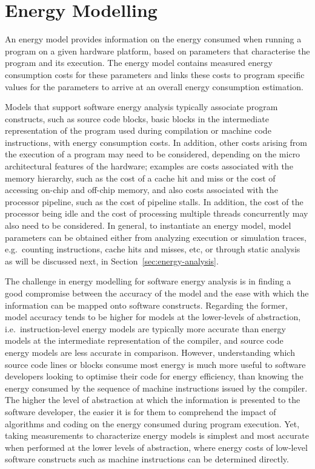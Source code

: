 \nopagebreak
\section{Energy Modelling}\label{sec:energy-models}

An energy model provides information on the energy consumed when running a program on a given hardware platform, based on parameters that characterise the program and its execution. The energy model contains measured energy consumption costs for these parameters and links these costs to program specific values for the parameters to arrive at an overall energy consumption estimation. 

Models that support software energy analysis typically associate program constructs, such as source code blocks, basic blocks in the intermediate representation of the program used during compilation or machine code instructions, with energy consumption costs. In addition, other costs arising from the execution of a program may need to be considered, depending on the micro architectural features of the hardware; examples are costs associated with the memory hierarchy, such as the cost of a cache hit and miss or the cost of accessing on-chip and off-chip memory, and also costs associated with the processor pipeline, such as the cost of pipeline stalls. In addition, the cost of the processor being idle and the cost of processing multiple threads concurrently may also need to be considered. 
%
In general, to instantiate an energy model, model parameters can be obtained either from analyzing execution or simulation traces, e.g.\ counting instructions, cache hits and misses, etc, or through static analysis as will be discussed next, in Section~\ref{sec:energy-analysis}.

The challenge in energy modelling for software energy analysis is in finding a good compromise between the accuracy of the model and the ease with which the information can be mapped onto software constructs. Regarding the former, model accuracy tends to be higher for models at the lower-levels of abstraction, i.e.\ instruction-level energy models are typically more accurate than energy models at the intermediate representation of the compiler, and source code energy models are less accurate in comparison. 
%
However, understanding which source code lines or blocks consume most energy is much more useful to software developers looking to optimise their code for energy efficiency, than knowing the energy consumed by the sequence of machine instructions issued by the compiler. The higher the level of abstraction at which the information is presented to the software developer, the easier it is for them to comprehend the impact of algorithms and coding on the energy consumed during program execution. Yet, taking measurements to characterize energy models is simplest and most accurate when performed at the lower levels of abstraction, where energy costs of low-level software constructs such as machine instructions can be determined directly.



